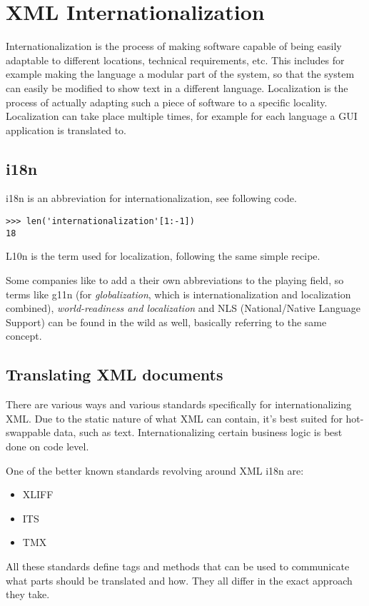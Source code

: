 \chapter{XML Internationalization}
Internationalization is the process of making software capable of being easily adaptable to different locations, technical requirements, etc. This includes for example making the language a modular part of the system, so that the system can easily be modified to show text in a different language.
Localization is the process of actually adapting such a piece of software to a specific locality. Localization can take place multiple times, for example for each language a GUI application is translated to.
\section{i18n}
i18n is an abbreviation for internationalization, see following code.
\begin{verbatim}
>>> len('internationalization'[1:-1])
18
\end{verbatim}
L10n is the term used for localization, following the same simple recipe.

Some companies like to add a their own abbreviations to the playing field, so terms like g11n (for \emph{globalization}, which is internationalization and localization combined), \emph{world-readiness and localization} and NLS (National/Native Language Support) can be found in the wild as well, basically referring to the same concept.

\section{Translating XML documents}

 There are various ways and various standards specifically for internationalizing XML. Due to the static nature of what XML can contain, it's best suited for hot-swappable data, such as text. Internationalizing certain business logic is best done on code level.

One of the better known standards revolving around XML i18n are: 

\begin{itemize}
\item{XLIFF}
\item{ITS}
\item{TMX}
\end{itemize}

All these standards define tags and methods that can be used to communicate what parts should be translated and how. They all differ in the exact approach they take. 

